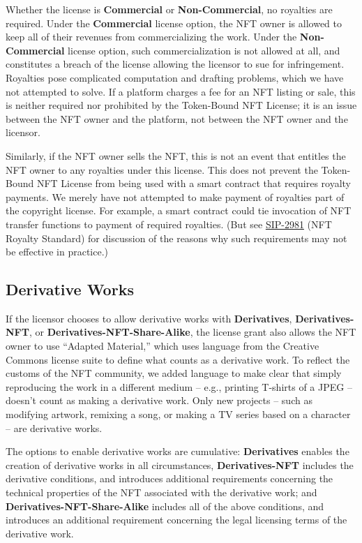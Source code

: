 \documentclass{article}
\newcommand{\iccclicense}{Token-Bound NFT License\xspace}
\newcommand{\keyword}[1]{\textbf{#1}\xspace}
\newcommand{\commercial}{\keyword{Commercial}}
\newcommand{\noncommercial}{\keyword{Non-Commercial}}
\newcommand{\derivative}{\keyword{Derivatives}}
\newcommand{\derivativetracking}{\keyword{Derivatives-NFT}}
\newcommand{\sharealike}{\keyword{Derivatives-NFT-Share-Alike}}
\begin{document}
Whether the license is \commercial or \noncommercial, no royalties are required. Under the \commercial license option, the NFT owner is allowed to keep all of their revenues from commercializing the work. Under the \noncommercial license option, such commercialization is not allowed at all, and constitutes a breach of the license allowing the licensor to sue for infringement. Royalties pose complicated computation and drafting problems, which we have not attempted to solve. If a platform charges a fee for an NFT listing or sale, this is neither required nor prohibited by the \iccclicense; it is an issue between the NFT owner and the platform, not between the NFT owner and the licensor.  

Similarly, if the NFT owner sells the NFT, this is not an event that entitles the NFT owner to any royalties under this license.  This does not prevent the \iccclicense from being used with a smart contract that requires royalty payments. We merely have not attempted to make payment of royalties part of the copyright license. For example, a smart contract could tie invocation of NFT transfer functions to payment of required royalties. (But see \href{https://sips.sila.org/SIPS/sip-2981}{SIP-2981} (NFT Royalty Standard) for discussion of the reasons why such requirements may not  be effective in practice.) 

\subsection{Derivative Works}

If the licensor chooses to allow derivative works with \derivative, \derivativetracking, or \sharealike, the license grant also allows the NFT owner to use ``Adapted Material,'' which uses language from the Creative Commons license suite to define what counts as a derivative work. To reflect the customs of the NFT community, we added language to make clear that simply reproducing the work in a different medium -- e.g., printing T-shirts of a JPEG -- doesn't count as making a derivative work. Only new projects -- such as modifying artwork, remixing a song, or making a TV series based on a character -- are derivative works.

The options to enable derivative works are cumulative: \derivative enables the creation of derivative works in all circumstances, \derivativetracking includes the derivative conditions, and introduces additional requirements concerning the technical properties of the NFT associated with the derivative work; and \sharealike includes all of the above conditions, and introduces an additional requirement concerning the legal licensing terms of the derivative work.
\end{document}
